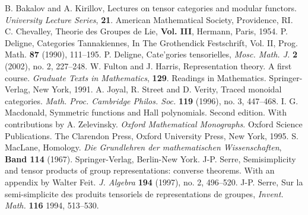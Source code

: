 \documentclass{amsart}
\theoremstyle{definition}
\begin{document}
\begin{thebibliography}{DGNO}
 B. Bakalov and A. Kirillov, Lectures on tensor categories
and modular functors. {\em University Lecture Series}, {\bf 21}.
American Mathematical Society, Providence, RI.
 C. Chevalley, Theorie des Groupes de Lie, {\bf Vol. III},
Hermann, Paris, 1954.
 P. Deligne, Categories Tannakiennes, In The Grothendick
Festschrift, Vol. II, Prog. Math. {\bf 87} (1990), 111--195.
 P. Deligne, Cate'gories tensorielles, {\em Mosc. Math. J.}
{\bf 2} (2002), no. 2, 227--248.
 W. Fulton and J. Harris, Representation theory. A first
course. {\em Graduate Texts in Mathematics}, {\bf 129}. Readings in
Mathematics. Springer-Verlag, New York, 1991.
 A. Joyal, R. Street and D. Verity, Traced monoidal
categories. {\em Math. Proc. Cambridge Philos. Soc.} {\bf 119}
(1996), no. 3, 447--468.
 I. G. Macdonald, Symmetric functions and Hall
polynomials. Second edition. With contributions by A. Zelevinsky.
{\em Oxford Mathematical Monographs}. Oxford Science Publications.
The Clarendon Press, Oxford University Press, New York, 1995.
 S. MacLane, Homology. {\em Die Grundlehren der
mathematischen Wissenschaften}, {\bf Band 114} (1967).
Springer-Verlag, Berlin-New York.
 J-P. Serre, Semisimplicity and tensor products of group
representations: converse theorems. With an appendix by Walter Feit.
{\em J. Algebra} {\bf 194}  (1997),  no. 2, 496--520.
 J-P. Serre, Sur la semi-simplicite des produits tensoriels
de representations de groupes, {\em Invent. Math.} {\bf 116} 1994,
513--530.
\end{thebibliography}
\end{document}

